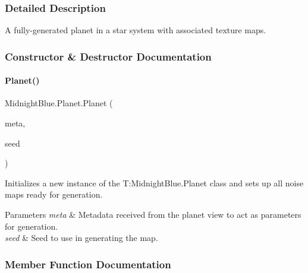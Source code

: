 \subsubsection{Detailed Description}
A fully-\/generated planet in a star system with associated texture maps. 



\subsubsection{Constructor \& Destructor Documentation}
\hypertarget{class_midnight_blue_1_1_planet_a649f87901a50e64a6423438504e468a4}{}\label{class_midnight_blue_1_1_planet_a649f87901a50e64a6423438504e468a4} 
\paragraph{\texorpdfstring{Planet()}{Planet()}}
{\footnotesize\ttfamily Midnight\+Blue.\+Planet.\+Planet (\begin{DoxyParamCaption}\item[{\hyperlink{class_midnight_blue_1_1_planet_metadata}{Planet\+Metadata}}]{meta,  }\item[{int}]{seed }\end{DoxyParamCaption})\hspace{0.3cm}{\ttfamily [inline]}}



Initializes a new instance of the T\+:\+Midnight\+Blue.\+Planet class and sets up all noise maps ready for generation. 


\begin{DoxyParams}{Parameters}
{\em meta} & Metadata received from the planet view to act as parameters for generation.\\
\hline
{\em seed} & Seed to use in generating the map.\\
\hline
\end{DoxyParams}


\subsubsection{Member Function Documentation}
\hypertarget{class_midnight_blue_1_1_planet_ae39b013905369f01902b4f28d4fc031e}{}\label{class_midnight_blue_1_1_planet_ae39b013905369f01902b4f28d4fc031e} 
